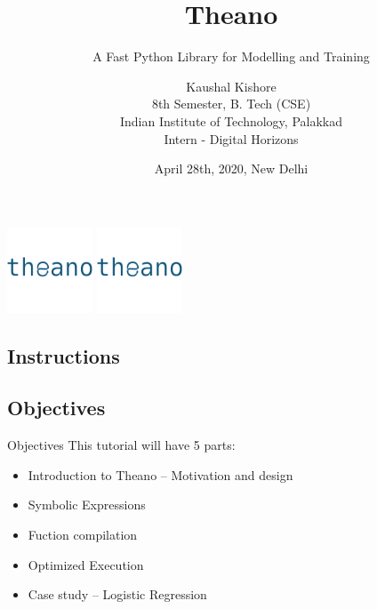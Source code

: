 \documentclass[a4paper,9pt]{beamer}
\title[Theano]{Theano}
\subtitle{A Fast Python Library for Modelling and Training}
\author[Kaushal Kishore]{%
Kaushal Kishore\\
8th Semester, B. Tech (CSE) \\
Indian Institute of Technology, Palakkad\\
Intern - Digital Horizons}
\date{%
April 28th, 2020, New Delhi%
}
\begin{document}
\begin{frame}[plain]
  \titlepage
  \includegraphics[width=1in]{theano.png}
  \hfill
  \includegraphics[width=1in]{theano.png}
\end{frame}


\subsection*{Instructions}

\subsection*{Objectives}
\begin{frame}[fragile]{Objectives}
  This tutorial will have 5 parts:
  \begin{itemize}
    \item Introduction to Theano -- Motivation and design
    \item Symbolic Expressions
    \item Fuction compilation
    \item Optimized Execution
    \item Case study -- Logistic Regression
  \end{itemize}


\end{frame}
\end{document}

